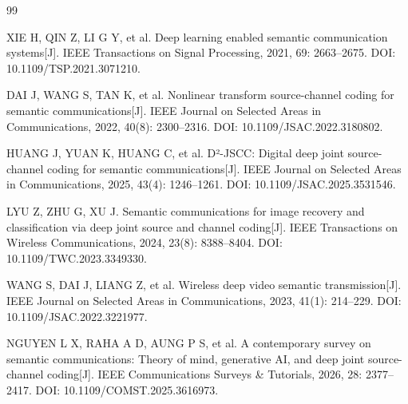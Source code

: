 \begin{thebibliography}{99}

XIE H, QIN Z, LI G Y, et al. Deep learning enabled semantic communication systems[J]. IEEE Transactions on Signal Processing, 2021, 69: 2663--2675. DOI: 10.1109/TSP.2021.3071210.

DAI J, WANG S, TAN K, et al. Nonlinear transform source-channel coding for semantic communications[J]. IEEE Journal on Selected Areas in Communications, 2022, 40(8): 2300--2316. DOI: 10.1109/JSAC.2022.3180802.

HUANG J, YUAN K, HUANG C, et al. D²-JSCC: Digital deep joint source-channel coding for semantic communications[J]. IEEE Journal on Selected Areas in Communications, 2025, 43(4): 1246--1261. DOI: 10.1109/JSAC.2025.3531546.

LYU Z, ZHU G, XU J. Semantic communications for image recovery and classification via deep joint source and channel coding[J]. IEEE Transactions on Wireless Communications, 2024, 23(8): 8388--8404. DOI: 10.1109/TWC.2023.3349330.

WANG S, DAI J, LIANG Z, et al. Wireless deep video semantic transmission[J]. IEEE Journal on Selected Areas in Communications, 2023, 41(1): 214--229. DOI: 10.1109/JSAC.2022.3221977.

NGUYEN L X, RAHA A D, AUNG P S, et al. A contemporary survey on semantic communications: Theory of mind, generative AI, and deep joint source-channel coding[J]. IEEE Communications Surveys \& Tutorials, 2026, 28: 2377--2417. DOI: 10.1109/COMST.2025.3616973.

\end{thebibliography}
